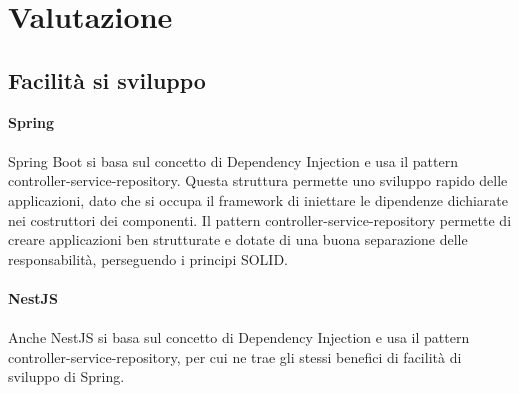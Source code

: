 \section{Valutazione}
\subsection{Facilità si sviluppo}
\textbf{Spring}
\\\\
Spring Boot si basa sul concetto di Dependency Injection e usa il pattern controller-service-repository. 
Questa struttura permette uno sviluppo rapido delle applicazioni, dato
che si occupa il framework di iniettare le dipendenze dichiarate nei costruttori dei componenti. 
Il pattern controller-service-repository permette di creare applicazioni ben strutturate e dotate di una 
buona separazione delle responsabilità, perseguendo i principi SOLID.
\\\\
\textbf{NestJS}
\\\\
Anche NestJS si basa sul concetto di Dependency Injection e usa il pattern controller-service-repository, per
cui ne trae gli stessi benefici di facilità di sviluppo di Spring.

